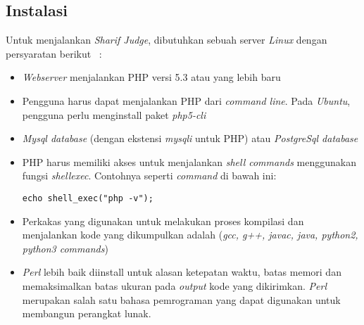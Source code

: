 \subsection{Instalasi}
Untuk menjalankan \textit{Sharif Judge}, dibutuhkan sebuah server \textit{Linux} dengan persyaratan berikut ~\cite{mjnaderi:14:sharifjudgedoc}:
\begin{itemize}
	\item \textit{Webserver} menjalankan PHP versi 5.3 atau yang lebih baru
	\item Pengguna harus dapat menjalankan PHP dari \textit{command line}. Pada \textit{Ubuntu}, pengguna perlu menginstall paket \textit{php5-cli}
	\item \textit{Mysql database} (dengan ekstensi \textit{mysqli} untuk PHP) atau \textit{PostgreSql database}
	\item PHP harus memiliki akses untuk menjalankan \textit{shell commands} menggunakan fungsi \textit{shell\textunderscore exec}. Contohnya seperti \textit{command} di bawah ini: 
		\begin{lstlisting}[basicstyle=\ttfamily, frame=single,
columns=fullflexible, keepspaces=true, breaklines=true]
echo shell_exec("php -v");
\end{lstlisting}
	\item Perkakas yang digunakan untuk melakukan proses kompilasi dan menjalankan kode yang dikumpulkan adalah (\textit{gcc, g++, javac, java, python2, python3 commands})
	\item \textit{Perl} lebih baik diinstall untuk alasan ketepatan waktu, batas memori dan memaksimalkan batas ukuran pada \textit{output} kode yang dikirimkan. \textit{Perl} merupakan salah satu bahasa pemrograman yang dapat digunakan untuk membangun perangkat lunak.
\end{itemize}


